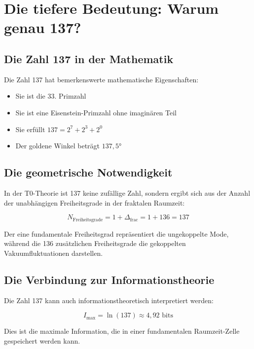 \documentclass[12pt,a4paper]{article}
\theoremstyle{definition}
\begin{document}
	\section{Die tiefere Bedeutung: Warum genau 137?}
	
	\subsection{Die Zahl 137 in der Mathematik}
	
	Die Zahl 137 hat bemerkenswerte mathematische Eigenschaften:
	
	\begin{itemize}
		\item Sie ist die 33. Primzahl
		\item Sie ist eine Eisenstein-Primzahl ohne imaginären Teil
		\item Sie erfüllt $137 = 2^7 + 2^3 + 2^0$
		\item Der goldene Winkel beträgt $137{,}5°$
	\end{itemize}
	
	\subsection{Die geometrische Notwendigkeit}
	
	In der T0-Theorie ist 137 keine zufällige Zahl, sondern ergibt sich aus der Anzahl der unabhängigen Freiheitsgrade in der fraktalen Raumzeit:
	
	\begin{equation}
		N_{\text{Freiheitsgrade}} = 1 + \Delta_{\text{frac}} = 1 + 136 = 137
	\end{equation}
	
	Der eine fundamentale Freiheitsgrad repräsentiert die ungekoppelte Mode, während die 136 zusätzlichen Freiheitsgrade die gekoppelten Vakuumfluktuationen darstellen.
	
	\subsection{Die Verbindung zur Informationstheorie}
	
	Die Zahl 137 kann auch informationstheoretisch interpretiert werden:
	
	\begin{equation}
		I_{\text{max}} = \ln(137) \approx 4{,}92 \text{ bits}
	\end{equation}
	
	Dies ist die maximale Information, die in einer fundamentalen Raumzeit-Zelle gespeichert werden kann.
	
\end{document}
